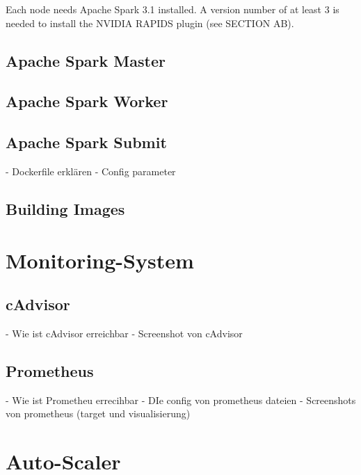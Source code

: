 Each node needs Apache Spark 3.1 installed. A version number of at least 3 is needed to install the NVIDIA RAPIDS plugin (see SECTION AB).


\subsection{Apache Spark Master}


\subsection{Apache Spark Worker}


\subsection{Apache Spark Submit}
- Dockerfile erklären
- Config parameter


\subsection{Building Images}


\section{Monitoring-System}


\subsection{cAdvisor}
- Wie ist cAdvisor erreichbar
- Screenshot von cAdvisor 


\subsection{Prometheus}
- Wie ist Prometheu errecihbar
- DIe config von prometheus dateien
- Screenshots von prometheus (target und visualisierung)



%
%


\section{Auto-Scaler}


